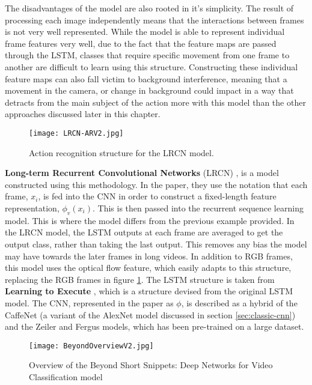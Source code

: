 The disadvantages of the model are also rooted in it's simplicity. The result of processing each image independently means that the interactions between frames is not very well represented. While the model is able to represent individual frame features very well, due to the fact that the feature maps are passed through the LSTM, classes that require specific movement from one frame to another are difficult to learn using this structure. Constructing these individual feature maps can also fall victim to background interference, meaning that a movement in the camera, or change in background could impact in a way that detracts from the main subject of the action more with this model than the other approaches discussed later in this chapter.

\begin{figure}[ht]
	\texttt{[image: LRCN-ARV2.jpg]}
	\centering
	\caption{Action recognition structure for the LRCN model. \cite{LRCNS}}
	\label{fig:lrcn-ar}
\end{figure}

\textbf{Long-term Recurrent Convolutional Networks} (LRCN) \cite{LRCNS}, is a model constructed using this methodology. In the paper, they use the notation that each frame, $x_{i}$, is fed into the CNN in order to construct a fixed-length feature representation, $\phi_{v}(x_{i})$. This is then passed into the recurrent sequence learning model. This is where the model differs from the previous example provided. In the LRCN model, the LSTM outputs at each frame are averaged to get the output class, rather than taking the last output. This removes any bias the model may have towards the later frames in long videos. In addition to RGB frames, this model uses the optical flow feature, which easily adapts to this structure, replacing the RGB frames in figure \ref{fig:lrcn-ar}. The LSTM structure is taken from \textbf{Learning to Execute} \cite{LSTM-2015}, which is a structure devised from the original LSTM model. The CNN, represented in the paper as $\phi$, is described as a hybrid of the CaffeNet \cite{caffenet} (a variant of the AlexNet \cite{alexnet} model discussed in section \ref{sec:classic-cnn}) and the Zeiler and Fergus \cite{zeilerfergus} models, which has been pre-trained on a large dataset.

\begin{figure}[ht]
	\texttt{[image: BeyondOverviewV2.jpg]}
	\centering
	\caption{Overview of the Beyond Short Snippets: Deep Networks for Video Classification model \cite{beyondshortsnippets}}
	\label{fig:beyondoverview}
\end{figure}

